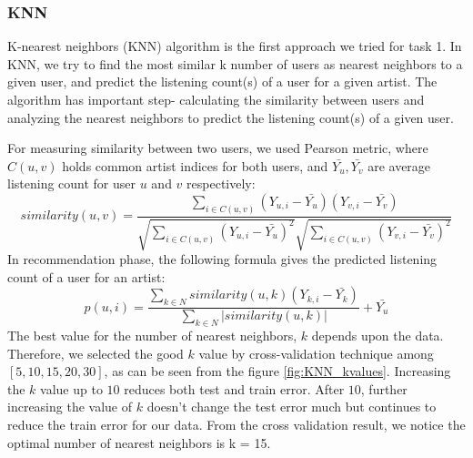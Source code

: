 
\subsubsection{KNN}
K-nearest neighbors (KNN) algorithm is the first approach we tried for task 1. In KNN, we try to find the most similar k number of users as nearest neighbors to a given user, and predict the listening count(s) of a user for a given artist. The algorithm has important step- calculating the similarity between users and analyzing the nearest neighbors to predict the listening count(s) of a given user. 

For measuring similarity between two users, we used Pearson metric, where $C(u,v)$ holds common artist indices for both users, and $\bar{Y_u}, \bar{Y_v}$  are average listening count for user $u$ and $v$ respectively:
\begin{equation}
  similarity(u, v)=\frac{\sum_{i\in C(u,v)} (Y_{u,i} - \bar{Y_u})(Y_{v,i} - \bar{Y_v})}{\sqrt{\sum_{i\in C(u,v)} (Y_{u,i} - \bar{Y_{u}})^2} \sqrt{\sum_{i\in C(u,v)} (Y_{v,i} - \bar{Y_{v}})^2}}
\end{equation}
In recommendation phase, the following formula gives the predicted listening count of a user for an artist:
 \begin{equation}
  p(u, i)=\frac{\sum_{k \in N} similarity(u, k) (Y_{k,i} - \bar{Y_k})}{\sum_{k \in N} | similarity(u, k) |} + \bar{Y_u}
\end{equation}
The best value for the number of nearest neighbors, $k$ depends upon the data. Therefore, we selected the good $k$ value by cross-validation technique among $[5, 10, 15, 20, 30]$, as can be seen from the figure \ref{fig:KNN_kvalues}. Increasing the $k$ value up to $10$ reduces both test and train error. After $10$, further increasing the value of $k$ doesn't change the test error much but continues to reduce the train error for our data. From the cross validation result, we notice the optimal number of nearest neighbors is k = 15.

